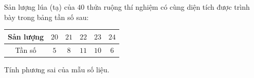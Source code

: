 \begin{ex}
Sản lượng lúa (tạ) của $40$ thửa ruộng thí nghiệm có cùng diện tích được trình bày trong bảng tần số sau:
\begin{center}
\begin{tabular}{|c|c|c|c|c|c|}\hline
Sản lượng & $20$ & $21$ & $22$ & $23$ & $24$\\\hline
Tần số & $5$ & $8$ & $11$ & $10$ & $6$\\\hline
\end{tabular}
\end{center}
Tính phương sai của mẫu số liệu.
\end{ex}
